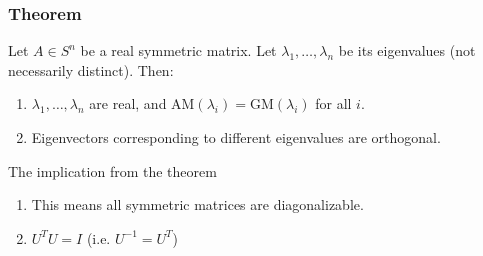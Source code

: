 \subsubsection{Theorem}

\begin{theorem}
    Let $A \in S^n$ be a real symmetric matrix. Let $\lambda_1, \dots, \lambda_n$ be its eigenvalues (not necessarily distinct). Then:
    \begin{enumerate}
        \item $\lambda_1, \dots, \lambda_n$ are real, and $\text{AM}(\lambda_i) = \text{GM}(\lambda_i)$ for all $i$.
        \item Eigenvectors corresponding to different eigenvalues are orthogonal.
    \end{enumerate}
\end{theorem}

\begin{warning}
    The implication from the theorem
    \begin{enumerate}
        \item This means all symmetric matrices are diagonalizable. 
        \item $U^T U = I$ (i.e. $U^{-1} = U^T$)
    \end{enumerate}
\end{warning}

